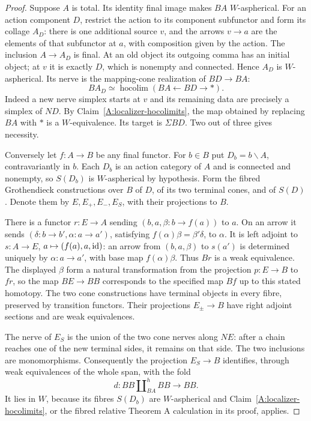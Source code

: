 \begin{proof}
Suppose $A$ is total. Its identity final image makes $BA$ $W$-aspherical. For an action component $D$, restrict the action to its component subfunctor and form its collage $A_D$: there is one additional source $v$, and the arrows $v\to a$ are the elements of that subfunctor at $a$, with composition given by the action. The inclusion $A\to A_D$ is final. At an old object its outgoing comma has an initial object; at $v$ it is exactly $D$, which is nonempty and connected. Hence $A_D$ is $W$-aspherical. Its nerve is the mapping-cone realization of $BD\to BA$:
\[
 BA_D\simeq\operatorname{hocolim}(BA\longleftarrow BD\longrightarrow *).
\]
Indeed a new nerve simplex starts at $v$ and its remaining data are precisely a simplex of $ND$. By Claim~\ref{A:localizer-hocolimits}, the map obtained by replacing $BA$ with $*$ is a $W$-equivalence. Its target is $\Sigma BD$. Two out of three gives necessity.

Conversely let $f:A\to B$ be any final functor. For $b\in B$ put $D_b=b\backslash A$, contravariantly in $b$. Each $D_b$ is an action category of $A$ and is connected and nonempty, so $S(D_b)$ is $W$-aspherical by hypothesis. Form the fibred Grothendieck constructions over $B$ of $D$, of its two terminal cones, and of $S(D)$. Denote them by $E,E_+,E_-,E_S$, with their projections to $B$.

There is a functor $r:E\to A$ sending $(b,a,\beta:b\to f(a))$ to $a$. On an arrow it sends $(\delta:b\to b',\alpha:a\to a')$, satisfying $f(\alpha)\beta=\beta'\delta$, to $\alpha$. It is left adjoint to $s:A\to E$, $a\mapsto(f(a),a,\mathrm{id})$: an arrow from $(b,a,\beta)$ to $s(a')$ is determined uniquely by $\alpha:a\to a'$, with base map $f(\alpha)\beta$. Thus $Br$ is a weak equivalence. The displayed $\beta$ form a natural transformation from the projection $p:E\to B$ to $fr$, so the map $BE\to BB$ corresponds to the specified map $Bf$ up to this stated homotopy. The two cone constructions have terminal objects in every fibre, preserved by transition functors. Their projections $E_\pm\to B$ have right adjoint sections and are weak equivalences.

The nerve of $E_S$ is the union of the two cone nerves along $NE$: after a chain reaches one of the new terminal sides, it remains on that side. The two inclusions are monomorphisms. Consequently the projection $E_S\to B$ identifies, through weak equivalences of the whole span, with the fold
\[
 d:BB\amalg_{BA}^{h}BB\longrightarrow BB.
\]
It lies in $W$, because its fibres $S(D_b)$ are $W$-aspherical and Claim~\ref{A:localizer-hocolimits}, or the fibred relative Theorem A calculation in its proof, applies.


\end{proof}
